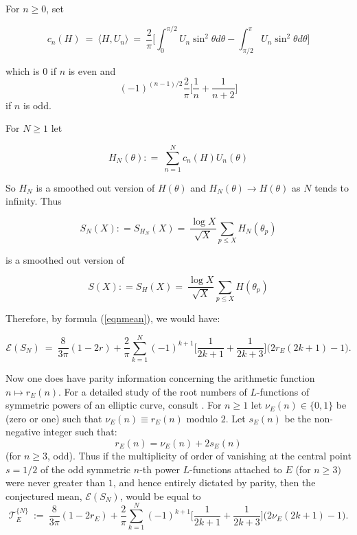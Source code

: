 \documentclass[11pt]{article}
\theoremstyle{plain}
\theoremstyle{definition}
\numberwithin{equation}{section}
\numberwithin{figure}{section}
\numberwithin{table}{section}
\begin{document}
For $n \ge 0$, set


\begin{equation}
c_n(H)  \ = \ \langle H, U_n\rangle \ = \ {\frac{2}{\pi}}\big[\int_0^{\pi/2}U_n\sin^2\theta d \theta - \int_{\pi/2}^{\pi}U_n\sin^2\theta d \theta \big]
\end{equation}


which is $0$ if $n$ is even and $$(-1)^{(n-1)/2}{\frac{2}{\pi}}\big[{\frac{1}{n}} + {\frac{1}{n+2}}\big]$$ if $n$ is odd.



For $N \ge 1$ let

\begin{equation}
H_N(\theta): = \ \sum_{n=1}^Nc_n(H)U_n(\theta)
\end{equation}


So $H_N$ is a smoothed out version of $H(\theta)$ and $H_N(\theta) \to H(\theta)$ as $N $ tends to infinity.  Thus

\begin{equation}
S_N(X): = S_{H_N}(X) = \ {\frac{\log X}{{\sqrt{X}}}}\sum_{p \le X}H_N(\theta_p)
\end{equation}


is a smoothed out version of

\begin{equation}\label{smooth}
S(X): = S_{H}(X) = \ {\frac{\log X}{{\sqrt{X}}}}\sum_{p \le X}H(\theta_p)
\end{equation}

Therefore, by formula (\ref{eqnmean}), we would have:

\begin{equation}\label{early}
{\mathcal E}(S_N)\ = \ {\frac{8}{3\pi}}(1-2r) + {\frac{2}{\pi}} \sum_{k=1}^{N}  (-1)^{k+1}\big[{\frac{1}{2k+1}} + {\frac{1}{2k+3}}\big]\big(2r_E(2k+1)-1\big).
\end{equation}


Now one does have  parity information concerning the arithmetic function $n \mapsto r_E(n)$. For a detailed study of the root numbers of $L$-functions of symmetric powers of an elliptic curve, consult \cite{DMW}.
 For $n \ge 1$ let $ \nu_E(n) \in \{0,1\}$ be (zero or one) such that  $ \nu_E(n) \equiv r_E(n)$ modulo $2$. Let $s_E(n)$ be the non-negative integer such that:
 $$r_E(n) = \nu_E(n) + 2s_E(n)$$  (for $n\ge 3$, odd).
Thus if the multiplicity of order of vanishing at the central point $s=1/2$ of the odd symmetric $n$-th power $L$-functions attached to $E$ (for $n \ge 3)$ were never greater than  $1$, and hence entirely dictated by parity, then the conjectured mean, ${\mathcal E}(S_N)$, would be equal to
\begin{equation}\label{min}
{\mathcal T}_E^{\{N\}}\ := \ {\frac{8}{3\pi}}(1-2r_E) + {\frac{2}{\pi}} \sum_{k=1}^{N}  (-1)^{k+1}\big[{\frac{1}{2k+1}} + {\frac{1}{2k+3}}\big]\big(2\nu_E(2k+1)-1\big).
\end{equation}
\end{document}
